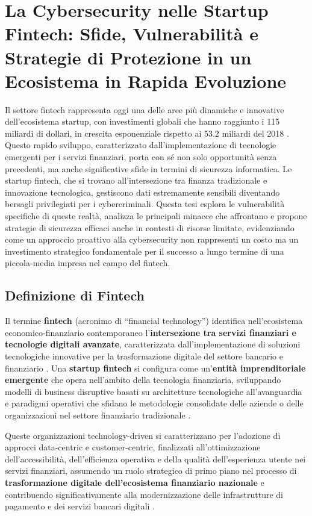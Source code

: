 \section{La Cybersecurity nelle Startup Fintech: Sfide, Vulnerabilità e Strategie di Protezione in un Ecosistema in Rapida Evoluzione}

Il settore fintech rappresenta oggi una delle aree più dinamiche e innovative dell'ecosistema startup, con investimenti globali che hanno raggiunto i 115 miliardi di dollari, in crescita esponenziale rispetto ai 53.2 miliardi del 2018 \cite{gartnerFintech}. Questo rapido sviluppo, caratterizzato dall'implementazione di tecnologie emergenti per i servizi finanziari, porta con sé non solo opportunità senza precedenti, ma anche significative sfide in termini di sicurezza informatica. Le startup fintech, che si trovano all'intersezione tra finanza tradizionale e innovazione tecnologica, gestiscono dati estremamente sensibili diventando bersagli privilegiati per i cybercriminali. Questa tesi esplora le vulnerabilità specifiche di queste realtà, analizza le principali minacce che affrontano e propone strategie di sicurezza efficaci anche in contesti di risorse limitate, evidenziando come un approccio proattivo alla cybersecurity non rappresenti un costo ma un investimento strategico fondamentale per il successo a lungo termine di una piccola-media impresa nel campo del fintech.

\subsection{Definizione di Fintech}

Il termine \textbf{fintech} (acronimo di ``financial technology'') identifica nell'ecosistema economico-finanziario contemporaneo l'\textbf{intersezione tra servizi finanziari e tecnologie digitali avanzate}, caratterizzata dall'implementazione di soluzioni tecnologiche innovative per la trasformazione digitale del settore bancario e finanziario \cite{tecnofinanza}. Una \textbf{startup fintech} si configura come un'\textbf{entità imprenditoriale emergente} che opera nell'ambito della tecnologia finanziaria, sviluppando modelli di business disruptive basati su architetture tecnologiche all'avanguardia e paradigmi operativi che sfidano le metodologie consolidate delle aziende o delle organizzazioni nel settore finanziario tradizionale \cite{fintech_numeri}.

Queste organizzazioni technology-driven si caratterizzano per l'adozione di approcci data-centric e customer-centric, finalizzati all'ottimizzazione dell'accessibilità, dell'efficienza operativa e della qualità dell'esperienza utente nei servizi finanziari, assumendo un ruolo strategico di primo piano nel processo di \textbf{trasformazione digitale dell'ecosistema finanziario nazionale} e contribuendo significativamente alla modernizzazione delle infrastrutture di pagamento e dei servizi bancari digitali \cite{tecnofinanza}.

